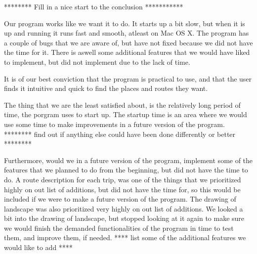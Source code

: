 ******** Fill in a nice start to the conclusion ***********

Our program works like we want it to do. It starts up a bit slow, but when it is up and running it runs fast and smooth, atleast on Mac OS X.
The program has a couple of bugs that we are aware of, but have not fixed because we did not have the time for it. There is aswell some additional features that we would have liked to implement, but did not implement due to the lack of time. 

It is of our best conviction that the program is practical to use, and that the user finds it intuitive and quick to find the places and routes they want. 

The thing that we are the least satisfied about, is the relatively long period of time, the porgram uses to start up. The startup time is an area where we would use some time to make improvements in a future version of the program. 
******** find out if anything else could have been done differently or better ********

Furthermore, would we in a future version of the program, implement some of the features that we planned to do from the beginning, but did not have the time to do. A route description for each trip, was one of the things that we prioritized highly on out list of additions, but did not have the time for, so this would be included if we were to make a future version of the program. 
The drawing of landscape was also prioritized very highly on out list of additions. We looked a bit into the drawing of landscape, but stopped looking at it again to make sure we would finish the demanded functionalities of the program in time to test them, and improve them, if needed.
**** list some of the additional features we would like to add ****
